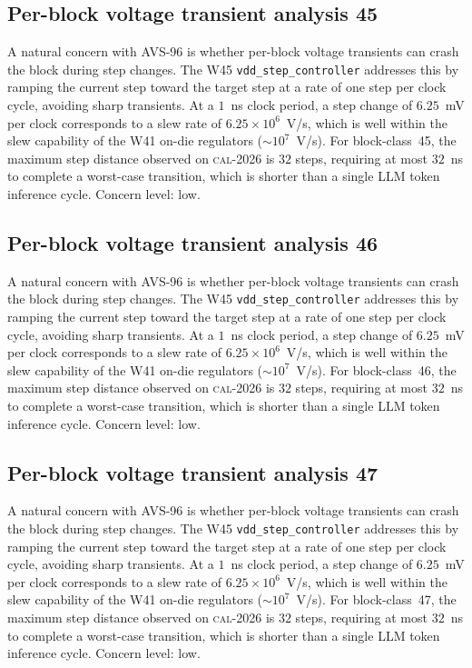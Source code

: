 \subsection{Per-block voltage transient analysis 45}

A natural concern with AVS-96 is whether per-block voltage transients
can crash the block during step changes. The W45 \texttt{vdd\_step\_controller} addresses this by ramping the current
step toward the target step at a rate of one step per clock cycle,
avoiding sharp transients. At a $1$~ns clock period, a step change of
$6.25$~mV per clock corresponds to a slew rate of $6.25\times 10^6$~V/s,
which is well within the slew capability of the W41 on-die regulators
($\sim 10^7$~V/s). For block-class~45, the maximum step distance
observed on \textsc{cal-2026} is $32$ steps, requiring at most $32$~ns
to complete a worst-case transition, which is shorter than a single
LLM token inference cycle. Concern level: low.


\subsection{Per-block voltage transient analysis 46}

A natural concern with AVS-96 is whether per-block voltage transients
can crash the block during step changes. The W45 \texttt{vdd\_step\_controller} addresses this by ramping the current
step toward the target step at a rate of one step per clock cycle,
avoiding sharp transients. At a $1$~ns clock period, a step change of
$6.25$~mV per clock corresponds to a slew rate of $6.25\times 10^6$~V/s,
which is well within the slew capability of the W41 on-die regulators
($\sim 10^7$~V/s). For block-class~46, the maximum step distance
observed on \textsc{cal-2026} is $32$ steps, requiring at most $32$~ns
to complete a worst-case transition, which is shorter than a single
LLM token inference cycle. Concern level: low.


\subsection{Per-block voltage transient analysis 47}

A natural concern with AVS-96 is whether per-block voltage transients
can crash the block during step changes. The W45 \texttt{vdd\_step\_controller} addresses this by ramping the current
step toward the target step at a rate of one step per clock cycle,
avoiding sharp transients. At a $1$~ns clock period, a step change of
$6.25$~mV per clock corresponds to a slew rate of $6.25\times 10^6$~V/s,
which is well within the slew capability of the W41 on-die regulators
($\sim 10^7$~V/s). For block-class~47, the maximum step distance
observed on \textsc{cal-2026} is $32$ steps, requiring at most $32$~ns
to complete a worst-case transition, which is shorter than a single
LLM token inference cycle. Concern level: low.


